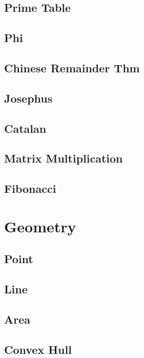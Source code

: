     \subsection{Prime Table}
        
    \subsection{Phi}
        
    \subsection{Chinese Remainder Thm}
        
    \subsection{Josephus}
        
    \subsection{Catalan}
        
    \subsection{Matrix Multiplication}
        
    \subsection{Fibonacci}
        

\section{Geometry}
    \subsection{Point}
        
    \subsection{Line}
        
    \subsection{Area}
        
    \subsection{Convex Hull}
        